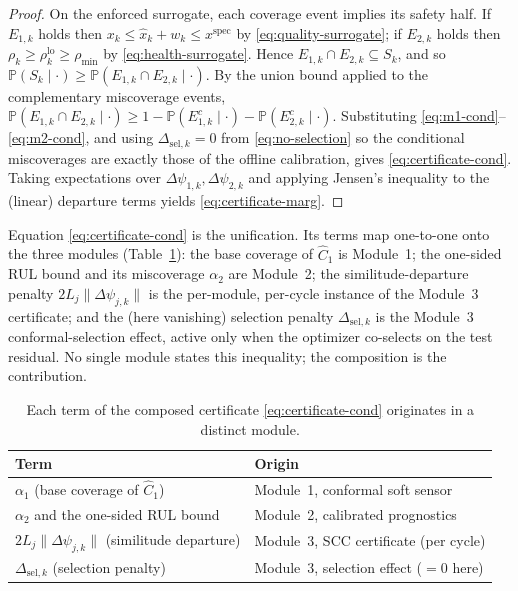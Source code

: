 \documentclass[review,12pt]{elsarticle}
\theoremstyle{definition}
\begin{document}
\begin{proof}
On the enforced surrogate, each coverage event implies its safety half. If
$E_{1,k}$ holds then $x_k \le \hat x_k + w_k \le x^{\mathrm{spec}}$ by
\eqref{eq:quality-surrogate}; if $E_{2,k}$ holds then
$\rho_k \ge \rho_k^{\mathrm{lo}} \ge \rho_{\min}$ by \eqref{eq:health-surrogate}.
Hence $E_{1,k}\cap E_{2,k} \subseteq S_k$, and so
$\mathbb{P}(S_k \mid \cdot) \ge \mathbb{P}(E_{1,k}\cap E_{2,k}\mid\cdot)$.
By the union bound applied to the complementary miscoverage events,
$\mathbb{P}(E_{1,k}\cap E_{2,k}\mid\cdot) \ge 1 - \mathbb{P}(E_{1,k}^c\mid\cdot)
- \mathbb{P}(E_{2,k}^c\mid\cdot)$. Substituting
\eqref{eq:m1-cond}--\eqref{eq:m2-cond}, and using
$\Delta_{\mathrm{sel},k}=0$ from \eqref{eq:no-selection} so the conditional
miscoverages are exactly those of the offline calibration, gives
\eqref{eq:certificate-cond}. Taking expectations over $\Delta\psi_{1,k},
\Delta\psi_{2,k}$ and applying Jensen's inequality to the (linear) departure terms
yields \eqref{eq:certificate-marg}.
\end{proof}

Equation \eqref{eq:certificate-cond} is the unification. Its terms map one-to-one
onto the three modules (Table~\ref{tab:terms}): the base coverage of $\hat C_1$ is
Module~1; the one-sided RUL bound and its miscoverage $\alpha_2$ are Module~2; the
similitude-departure penalty $2L_j\|\Delta\psi_{j,k}\|$ is the per-module,
per-cycle instance of the Module~3 certificate; and the (here vanishing) selection
penalty $\Delta_{\mathrm{sel},k}$ is the Module~3 conformal-selection effect, active
only when the optimizer co-selects on the test residual. No single module states
this inequality; the composition is the contribution.

\begin{table}[t]
\centering
\caption{Each term of the composed certificate \eqref{eq:certificate-cond}
originates in a distinct module.}
\label{tab:terms}
\begin{tabular}{ll}
\toprule
Term & Origin \\
\midrule
$\alpha_1$ (base coverage of $\hat C_1$) & Module~1, conformal soft sensor \\
$\alpha_2$ and the one-sided RUL bound & Module~2, calibrated prognostics \\
$2L_j\|\Delta\psi_{j,k}\|$ (similitude departure) & Module~3, SCC certificate (per cycle) \\
$\Delta_{\mathrm{sel},k}$ (selection penalty) & Module~3, selection effect ($=0$ here) \\
\bottomrule
\end{tabular}
\end{table}
\end{document}
